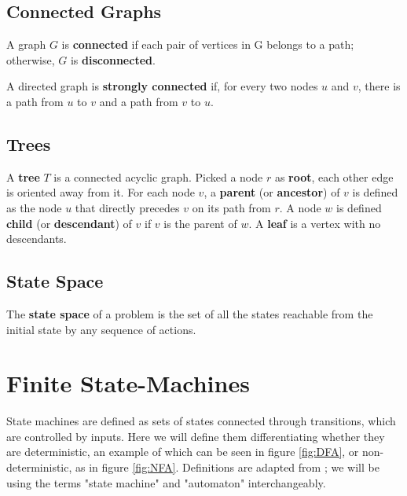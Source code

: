 \subsection{Connected Graphs}
\begin{definition}
A graph $G$ is \textbf{connected} if each pair of vertices in G belongs to a path; otherwise, $G$ is \textbf{disconnected}.
\end{definition}
\begin{definition}
A directed graph is \textbf{strongly connected} if, for every two nodes $u$ and $v$, there is a path from $u$ to $v$ and a path from $v$ to $u$.
\end{definition}

\subsection{Trees}
\begin{definition}
A \textbf{tree} $T$ is a connected acyclic graph. Picked a node $r$ as \textbf{root}, each other edge is oriented away from it. For each node $v$, a \textbf{parent} (or \textbf{ancestor}) of $v$ is defined as the node $u$ that directly precedes $v$ on its path from $r$. A node $w$ is defined \textbf{child} (or \textbf{descendant}) of $v$ if $v$ is the parent of $w$.  A \textbf{leaf} is a vertex with no descendants.
\end{definition}


\subsection{State Space}
\begin{definition}
The \textbf{state space} of a problem is the set of all the states reachable from the initial state by any sequence of actions.
\end{definition}

\section{Finite State-Machines}
State machines are defined as sets of states connected through transitions, which are controlled by inputs. Here we will define them differentiating whether they are deterministic, an example of which can be seen in figure \ref{fig:DFA}, or non-deterministic, as in figure \ref{fig:NFA}. Definitions are adapted from \cite{hopcroft2006automata}; we will be using the terms "state machine" and "automaton" interchangeably.

